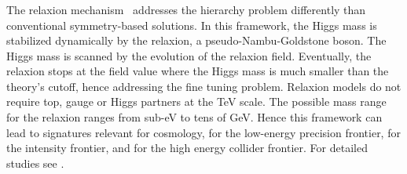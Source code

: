 \subsubsection{}

The relaxion mechanism~\cite{Graham:2015cka} addresses the hierarchy problem 
differently than conventional symmetry-based solutions. 
In this framework, the Higgs mass is stabilized dynamically by the relaxion, a pseudo-Nambu-Goldstone boson.
The Higgs mass is scanned by the evolution of the relaxion field. Eventually, the relaxion stops at the field value
where the Higgs mass is much smaller than the theory's cutoff, hence addressing the fine tuning problem.  
Relaxion models do not require top, gauge or Higgs partners at the TeV scale. The possible mass range for the relaxion ranges from sub-eV to tens of GeV.  Hence this framework can lead to signatures relevant for cosmology, for the low-energy precision frontier, for the intensity frontier, and for the high energy collider frontier. For detailed studies see .

